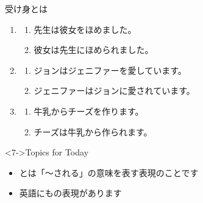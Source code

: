 \documentclass[aspectratio=169,xcolor={dvipsnames,table}]{beamer}
\begin{document}
\begin{frame}[plain]{受け身とは}
  \Large

  \begin{enumerate}
    \item<1-> \begin{enumerate}
            \item<1-> 先生は彼女をほめました。\hfill{}
            \item<2-> 彼女は先生にほめられました。\hfill{}
          \end{enumerate}
    \item<3-> \begin{enumerate}
            \item<3-> ジョンはジェニファーを愛しています。\hfill{}
            \item<4-> ジェニファーはジョンに愛されています。\hfill{}
          \end{enumerate}
    \item<5-> \begin{enumerate}
            \item<5-> 牛乳からチーズを作ります。\hfill{}
            \item<6-> チーズは牛乳から作られます。\hfill{}
          \end{enumerate}
  \end{enumerate}

  \vspace{15pt}

  \begin{block}<7->{Topics for Today}
    \begin{itemize}[square]\small
      \item<7-> とは「〜される」の意味を表す表現のことです
      \item<8-> 英語にもの表現があります
    \end{itemize}
  \end{block}

  \vspace{-8pt}

  \hfill{}

  \vspace{-8pt}


\end{frame}
\end{document}
